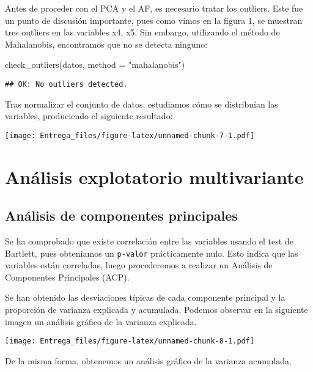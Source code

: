 \documentclass[
]{scrreprt}
\newenvironment{Shaded}{\begin{snugshade}}{\end{snugshade}}
\newcommand{\AttributeTok}[1]{\textcolor[rgb]{0.77,0.63,0.00}{#1}}
\newcommand{\FunctionTok}[1]{\textcolor[rgb]{0.00,0.00,0.00}{#1}}
\newcommand{\NormalTok}[1]{#1}
\newcommand{\StringTok}[1]{\textcolor[rgb]{0.31,0.60,0.02}{#1}}
\begin{document}
Antes de proceder con el PCA y el AF, es necesario tratar los outliers.
Este fue un punto de discusión importante, pues como vimos en la figura
1, se muestran tres outliers en las variables x4, x5. Sin embargo,
utilizando el método de Mahalanobis, encontramos que no se detecta
ninguno:

\begin{Shaded}
\begin{Highlighting}[]
\FunctionTok{check\_outliers}\NormalTok{(datos, }\AttributeTok{method =} \StringTok{"mahalanobis"}\NormalTok{)}
\end{Highlighting}
\end{Shaded}

\begin{verbatim}
## OK: No outliers detected.
\end{verbatim}

Tras normalizar el conjunto de datos, estudiamos cómo se distribuían las
variables, produciendo el siguiente resultado:

\texttt{[image: Entrega\_files/figure-latex/unnamed-chunk-7-1.pdf]}

\hypertarget{anuxe1lisis-explotatorio-multivariante}{%
\section{Análisis explotatorio
multivariante}\label{anuxe1lisis-explotatorio-multivariante}}

\hypertarget{anuxe1lisis-de-componentes-principales}{%
\subsection{Análisis de componentes
principales}\label{anuxe1lisis-de-componentes-principales}}

Se ha comprobado que existe correlación entre las variables usando el
test de Bartlett, pues obteníamos un \texttt{p-valor} prácticamente
nulo. Esto indica que las variables están correladas, luego procederemos
a realizar un Análisis de Componentes Principales (ACP).

Se han obtenido las desviaciones típicas de cada componente principal y
la proporción de varianza explicada y acumulada. Podemos observar en la
siguiente imagen un análisis gráfico de la varianza explicada.

\texttt{[image: Entrega\_files/figure-latex/unnamed-chunk-8-1.pdf]}

De la misma forma, obtenemos un análisis gráfico de la varianza
acumulada.
\end{document}
